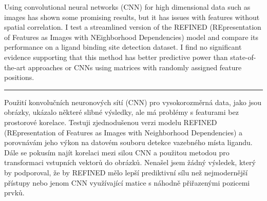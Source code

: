 \documentclass[12pt]{report}
\begin{document}
Using convolutional neural networks (CNN) for high dimensional data such as images has shown some promising results, but it has issues with features without spatial correlation. I test a streamlined version of the REFINED (REpresentation of Features as Images with NEighborhood Dependencies) model and compare its performance on a ligand binding site detection dataset. I find no significant evidence supporting that this method has better predictive power than state-of-the-art approaches or CNNs using matrices with randomly assigned feature positions.

\noindent\rule{2cm}{0.4pt}

Použití konvolučních neuronových sítí (CNN) pro vysokorozměrná data, jako jsou obrázky, ukázalo některé slibné výsledky, ale má problémy s featurami bez prostorové korelace. Testuji zjednodušenou verzi modelu REFINED (REpresentation of Features as Images with Neighborhood Dependencies) a porovnávám jeho výkon na datovém souboru detekce vazebného místa ligandu. Dále se pokusím najít korelaci mezi silou CNN a použitou metodou pro transformaci vstupních vektorů do obrázků. Nenašel jsem žádný výsledek, který by podporoval, že by REFINED mělo lepší prediktivní sílu než nejmodernější přístupy nebo jenom CNN využívající matice s náhodně přiřazenými pozicemi prvků.
\end{document}
